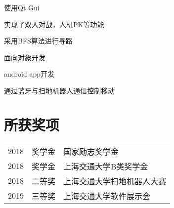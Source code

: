 \documentclass[]{deedy-resume-openfont}
\begin{document}
\begin{minipage}[t]{0.73\textwidth}
\begin{tightemize}
\item 使用Qt Gui
\item 实现了双人对战，人机PK等功能
\item 采用BFS算法进行寻路
\item 面向对象开发
\end{tightemize}
\sectionsep
\sectionsep

\begin{tightemize}
\item android app开发
\item 通过蓝牙与扫地机器人通信控制移动
\end{tightemize}
\sectionsep
\sectionsep




\section{所获奖项} 
\begin{tabular}{rll}
2018         & 奖学金  & 国家励志奖学金 \\
2018	     & 奖学金  & 上海交通大学B类奖学金 \\
2018	     & 二等奖  & 上海交通大学扫地机器人大赛 \\
2019         & 三等奖  & 上海交通大学软件展示会\\
\end{tabular}
\sectionsep


% 
% 

\end{minipage} 
\end{document}
